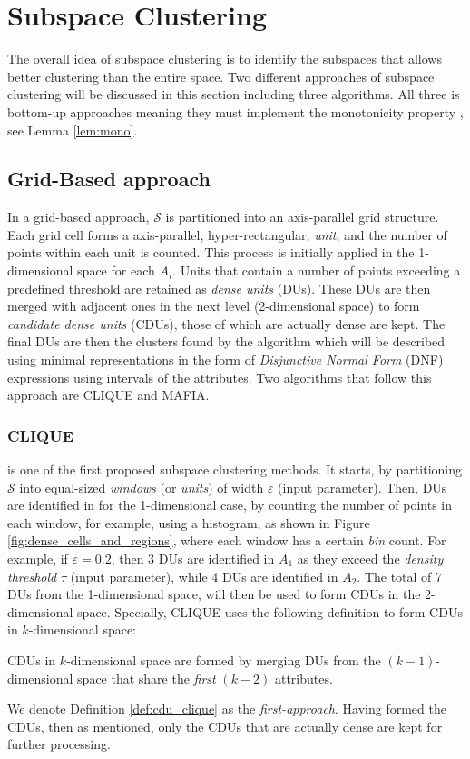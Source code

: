 \section{Subspace Clustering}
The overall idea of subspace clustering is to identify the subspaces that allows better clustering than the entire space. Two different approaches of subspace clustering will be discussed in this section including three algorithms. All three is bottom-up approaches meaning they must implement the monotonicity property \cite[p.~1:11]{kriegel-2009}, see Lemma \ref{lem:mono}.

\subsection{Grid-Based approach}
In a grid-based approach, $\mathcal{S}$ is partitioned into an axis-parallel grid structure. Each grid cell forms a axis-parallel, hyper-rectangular, \textit{unit}, and the number of points within each unit is counted. This process is initially applied in the 1-dimensional space for each $A_i$. Units that contain a number of points exceeding a predefined threshold are retained as \textit{dense units} (DUs). These DUs are then merged with adjacent ones in the next level (2-dimensional space) to form \textit{candidate dense units} (CDUs), those of which are actually dense are kept. The final DUs are then the clusters found by the algorithm which will be described using minimal representations in the form of \textit{Disjunctive Normal Form} (DNF) expressions using intervals of the attributes. Two algorithms that follow this approach are CLIQUE and MAFIA.

\subsubsection{CLIQUE}
is one of the first proposed subspace clustering methods. It starts, by partitioning $\mathcal{S}$ into equal-sized \textit{windows} (or \textit{units}) of width $\varepsilon$ (input parameter). Then, DUs are identified in for the 1-dimensional case, by counting the number of points in each window, for example, using a histogram, as shown in Figure \ref{fig:dense_cells_and_regions}, where each window has a certain \textit{bin} count. For example, if $\varepsilon = 0.2$, then 3 DUs are identified in $A_1$ as they exceed the \textit{density threshold} $\tau$ (input parameter), while 4 DUs are identified in $A_2$. The total of 7 DUs from the 1-dimensional space, will then be used to form CDUs in the 2-dimensional space. Specially, CLIQUE uses the following definition to form CDUs in $k$-dimensional space:
\begin{definition}\label{def:cdu_clique}
    CDUs in $k$-dimensional space are formed by merging DUs from the $(k-1)$-dimensional space that share the \textit{first} $(k-2)$ attributes.
\end{definition}
We denote Definition \ref{def:cdu_clique} as the \textit{first-approach}. Having formed the CDUs, then as mentioned, only the CDUs that are actually dense are kept for further processing.


